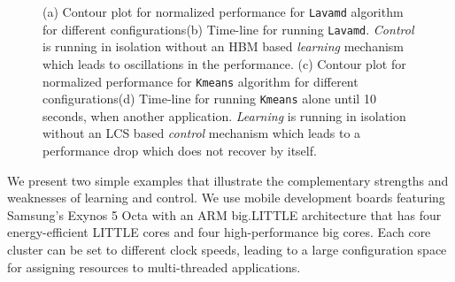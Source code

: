 \begin{figure}
  \subfloat[]
  {
    
    \label{fig:lavamd_timeline}
  }
  \subfloat[]
  {
    
    \label{fig:kmeans_timeline}    
  }
  \caption{(a) Contour plot for normalized performance for \texttt{Lavamd} algorithm for different configurations(b) Time-line for running \texttt{Lavamd}. \emph{Control} is running in isolation without an HBM based \emph{learning} mechanism which leads to oscillations in the performance. (c) Contour plot for normalized performance for \texttt{Kmeans} algorithm for different configurations(d) Time-line for running \texttt{Kmeans} alone until 10 seconds, when another application. \emph{Learning} is running in isolation without an LCS based \emph{control} mechanism which leads to a performance drop which does not recover by itself.}
  \label{fig:learning-models}
\end{figure}



We present two simple examples that illustrate the complementary
strengths and weaknesses of learning and control.  We use mobile
development boards featuring Samsung's Exynos 5 Octa with an ARM
big.LITTLE architecture that has four energy-efficient LITTLE cores
and four high-performance big cores.  Each core cluster can be set to
different clock speeds, leading to a large configuration space for
assigning resources to multi-threaded applications.

